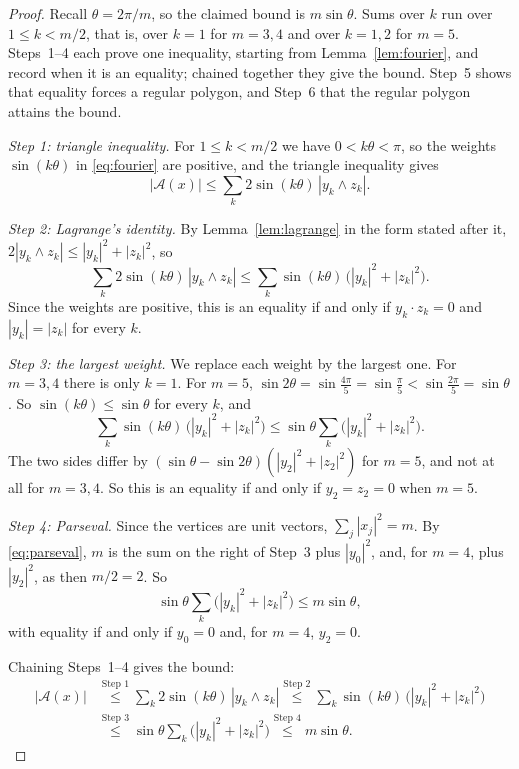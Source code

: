 \begin{proof}
  Recall $\theta = 2\pi/m$, so the claimed bound is $m\sin\theta$. Sums
  over $k$ run over $1 \leq k < m/2$, that is, over $k = 1$ for $m = 3, 4$
  and over $k = 1, 2$ for $m = 5$. Steps~1--4 each prove one inequality,
  starting from Lemma~\ref{lem:fourier}, and record when it is an
  equality; chained together they give the bound. Step~5 shows that
  equality forces a regular polygon, and Step~6 that the regular polygon
  attains the bound.

  \emph{Step 1: triangle inequality.} For $1 \leq k < m/2$ we have
  $0 < k\theta < \pi$, so the weights $\sin(k\theta)$ in \eqref{eq:fourier}
  are positive, and the triangle inequality gives
  \[
    |\mathcal{A}(x)| \leq \sum_{k} 2\sin(k\theta)\, |y_{k} \wedge z_{k}|.
  \]

  \emph{Step 2: Lagrange's identity.} By Lemma~\ref{lem:lagrange} in the
  form stated after it, $2|y_{k} \wedge z_{k}| \leq |y_{k}|^{2} +
  |z_{k}|^{2}$, so
  \[
    \sum_{k} 2\sin(k\theta)\, |y_{k} \wedge z_{k}|
      \leq \sum_{k} \sin(k\theta)\,\bigl(|y_{k}|^{2} + |z_{k}|^{2}\bigr).
  \]
  Since the weights are positive, this is an equality if and only if
  $y_{k} \cdot z_{k} = 0$ and $|y_{k}| = |z_{k}|$ for every $k$.

  \emph{Step 3: the largest weight.} We replace each weight by the largest
  one. For $m = 3, 4$ there is only $k = 1$. For $m = 5$,
  $\sin 2\theta = \sin\frac{4\pi}{5} = \sin\frac{\pi}{5} <
  \sin\frac{2\pi}{5} = \sin\theta$. So $\sin(k\theta) \leq \sin\theta$ for
  every $k$, and
  \[
    \sum_{k} \sin(k\theta)\,\bigl(|y_{k}|^{2} + |z_{k}|^{2}\bigr)
      \leq \sin\theta \sum_{k} \bigl(|y_{k}|^{2} + |z_{k}|^{2}\bigr).
  \]
  The two sides differ by $(\sin\theta - \sin 2\theta)(|y_{2}|^{2} +
  |z_{2}|^{2})$ for $m = 5$, and not at all for $m = 3, 4$. So this is an
  equality if and only if $y_{2} = z_{2} = 0$ when $m = 5$.

  \emph{Step 4: Parseval.} Since the vertices are unit vectors,
  $\sum_{j} |x_{j}|^{2} = m$. By \eqref{eq:parseval}, $m$ is the sum on the
  right of Step~3 plus $|y_{0}|^{2}$, and, for $m = 4$, plus
  $|y_{2}|^{2}$, as then $m/2 = 2$. So
  \[
    \sin\theta \sum_{k} \bigl(|y_{k}|^{2} + |z_{k}|^{2}\bigr)
      \leq m\sin\theta,
  \]
  with equality if and only if $y_{0} = 0$ and, for $m = 4$, $y_{2} = 0$.

  Chaining Steps~1--4 gives the bound:
  \[
    \begin{aligned}
      |\mathcal{A}(x)|
        &\stackrel{\text{Step 1}}{\leq}
          \sum_{k} 2\sin(k\theta)\, |y_{k} \wedge z_{k}|
        \stackrel{\text{Step 2}}{\leq}
          \sum_{k} \sin(k\theta)\,\bigl(|y_{k}|^{2} + |z_{k}|^{2}\bigr) \\
        &\stackrel{\text{Step 3}}{\leq}
          \sin\theta \sum_{k} \bigl(|y_{k}|^{2} + |z_{k}|^{2}\bigr)
        \stackrel{\text{Step 4}}{\leq} m\sin\theta.
    \end{aligned}
  \]


\end{proof}
